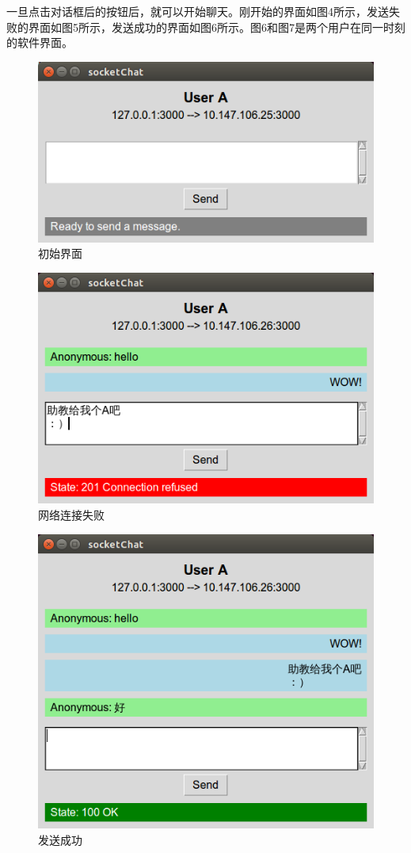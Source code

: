 \documentclass[a4paper, nofonts, nocap]{ctexart}
\begin{document}
一旦点击对话框后的按钮后，就可以开始聊天。刚开始的界面如图4所示，发送失败的界面如图5所示，发送成功的界面如图6所示。图6和图7是两个用户在同一时刻的软件界面。
\begin{figure}[ht]
	\centering
	\includegraphics[scale=0.8]{images/init.png}
	\caption{初始界面}
\end{figure}
\begin{figure}[ht]
	\centering
	\includegraphics[scale=0.8]{images/fail.png}
	\caption{网络连接失败}
\end{figure}
\begin{figure}[ht]
	\centering
	\includegraphics[scale=0.8]{images/success.png}
	\caption{发送成功}
\end{figure}
\end{document}
